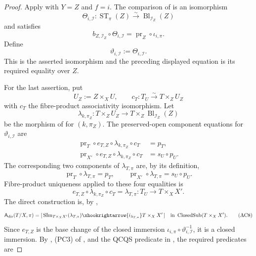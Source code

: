 \begin{proof}
  Apply  with $Y=Z$ and $f=i$.
  The comparison of
   is an isomorphism
  \[
    \Theta_{i,\mathcal I}\colon
      \operatorname{ST}_\pi(Z)\xrightarrow{\sim}
      \operatorname{Bl}_{\mathcal I_Z}(Z)
  \]
  and satisfies
  \[
    b_{Z,\mathcal I_Z}\circ\Theta_{i,\mathcal I}
      =\operatorname{pr}_Z\circ\iota_{i,\pi}.
  \]
  Define
  \[
    \vartheta_{i,\mathcal I}:=\Theta_{i,\mathcal I}.             \tag{AC5}
  \]
  This is the asserted isomorphism and the preceding displayed equation is
  its required equality over $Z$.

  For the last assertion, put
  \[
    U_Z:=Z\times_XU,
    \qquad
    c_T\colon T_U\xrightarrow{\sim}T\times_ZU_Z
  \]
  with $c_T$ the fibre-product associativity isomorphism.  Let
  \[
    \lambda_{k,\pi_Z}\colon
      T\times_ZU_Z\longrightarrow
      T\times_Z\operatorname{Bl}_{\mathcal I_Z}(Z)
  \]
  be the morphism of  for
  $(k,\pi_Z)$.  The preserved-open component equations for
  $\vartheta_{i,\mathcal I}$ are
  \[
  \begin{aligned}
    \operatorname{pr}_T\circ e_{T,Z}\circ
      \lambda_{k,\pi_Z}\circ c_T
      &=p_T,\\
    \operatorname{pr}_{X'}\circ e_{T,Z}\circ
      \lambda_{k,\pi_Z}\circ c_T
      &=s_U\circ p_U.
  \end{aligned}                                                   \tag{AC6}
  \]
  The corresponding two components of $\lambda_{T,\pi}$ are, by its
  definition,
  \[
    \operatorname{pr}_T\circ\lambda_{T,\pi}=p_T,
    \qquad
    \operatorname{pr}_{X'}\circ\lambda_{T,\pi}=s_U\circ p_U.
  \]
  Fibre-product uniqueness applied to these four equalities is
  \[
    e_{T,Z}\circ\lambda_{k,\pi_Z}\circ c_T
      =\lambda_{T,\pi}\colon T_U\to T\times_XX'.                \tag{AC7}
  \]
  The direct construction is, by ,
  \[
    \mathsf A_{\mathrm{dir}}(T/X,\pi)
      =[\,\operatorname{SIm}_{T\times_XX'}(\lambda_{T,\pi})
        \xhookrightarrow{i_{\lambda_{T,\pi}}}T\times_XX'\,]
      \quad\text{in }\operatorname{ClosedSub}(T\times_XX').    \tag{AC8}
  \]
  Since $e_{T,Z}$ is the base change of the closed immersion
  $\iota_{i,\pi}\circ\vartheta_{i,\mathcal I}^{-1}$, it is a closed
  immersion.  By , (PC3) of
  , and the QCQS predicate in
  , the required predicates are

\end{proof}

